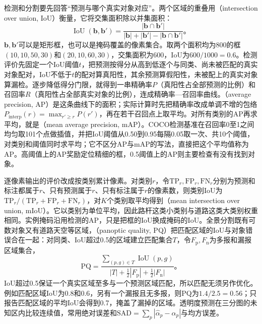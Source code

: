 检测和分割要先回答“预测与哪个真实对象对应”。两个区域的重叠用（intersection over union, IoU）衡量，它将交集面积除以并集面积：
\begin{equation}
 \operatorname{IoU}(\bm{b},\bm{b}')
 =\frac{|\bm{b}\cap\bm{b}'|}
 {|\bm{b}|+|\bm{b}'|-|\bm{b}\cap\bm{b}'|}\text{。}
 \label{eq:vision-iou}
\end{equation}
$\bm{b},\bm{b}'$可以是矩形框，也可以是掩码覆盖的像素集合。取两个面积均为800的框$(10,10,50,30)$和$(20,10,60,30)$，交集面积为600，IoU为$600/1000=0.6$。检测评价先固定一个IoU阈值$t$，把预测按得分从高到低逐个与同类、尚未被匹配的真实对象配对，IoU不低于$t$的配对算真阳性，其余预测算假阳性，未被配上的真实对象算漏检。逐步降低得分门限，就得到一串精确率$P$（真阳性占全部预测的比例）和召回率$R$（真阳性占全部真实对象的比例），连成精确率—召回率曲线。（average precision, AP）是这条曲线下的面积；实际计算时先把精确率改成单调不增的包络$P_{\mathrm{interp}}(r)=\max_{r'\geq r}P(r')$，再在若干召回点上取平均。对所有类别的AP再求平均，就是（mean average precision, mAP）。COCO检测基准在召回率0至1之间均匀取101个点做插值，并把IoU阈值从0.50到0.95每隔0.05取一次、共10个阈值，对类别和阈值同时求平均；它不区分AP与mAP的写法，直接把这个平均值称为AP。高阈值上的AP奖励定位精细的框，0.5阈值上的AP则主要检查有没有找到对象。

逐像素输出的评价改成按类别累计像素。对类别$r$，令$\mathrm{TP}_r,\mathrm{FP}_r,\mathrm{FN}_r$分别为预测和标注都属于$r$、只有预测属于$r$、只有标注属于$r$的像素数，则类别IoU为$\mathrm{TP}_r/(\mathrm{TP}_r+\mathrm{FP}_r+\mathrm{FN}_r)$，对$K$个类别取平均得到（mean intersection over union, mIoU）。它以类别为单位平均，因此路杆这类小类别与道路这类大类别权重相同。实例掩码沿用检测的AP，只是把框的IoU换成掩码的IoU。全景分割既有可数对象又有道路天空等区域，（panoptic quality, PQ）把匹配区域的IoU与对象错误合在一起：对同类、IoU超过0.5的区域建立匹配集合$T$，令$F_{\mathrm{p}},F_{\mathrm{n}}$为多报和漏报区域集合，
\begin{equation}
 \mathrm{PQ}=
 \frac{\sum_{(p,g)\in T}\operatorname{IoU}(p,g)}
 {|T|+\frac12|F_{\mathrm{p}}|+\frac12|F_{\mathrm{n}}|}\text{。}
 \label{eq:vision-pq}
\end{equation}
IoU超过0.5保证一个真实区域至多与一个预测区域匹配，所以匹配无须另作优化。例如匹配区域IoU为0.8和0.6，另有一个漏报且无多报，则PQ为$1.4/2.5=0.56$；只报告匹配区域的平均IoU会得到0.7，掩盖了漏掉的区域。透明度预测在三分图的未知区内比较连续值，常用绝对误差和$\mathrm{SAD}=\sum_p|\hat\alpha_p-\alpha_p|$与均方误差。

